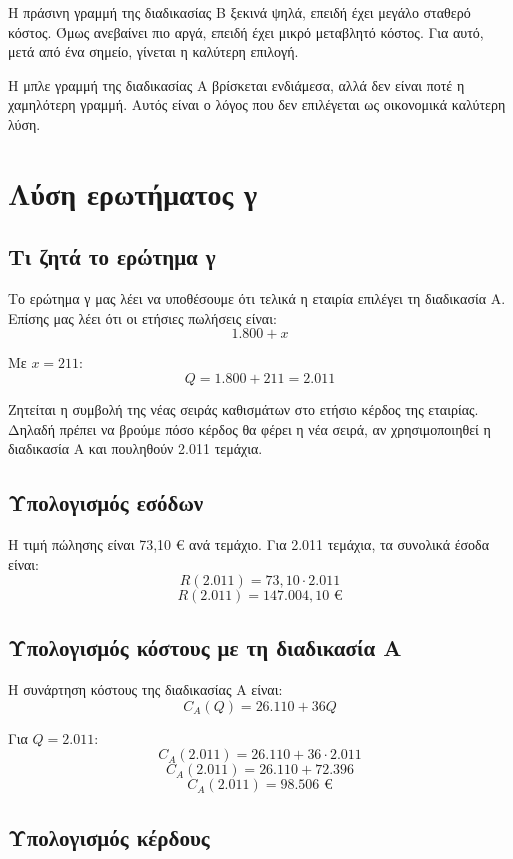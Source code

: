 \documentclass[12pt,a4paper]{article}
\begin{document}
Η πράσινη γραμμή της διαδικασίας Β ξεκινά ψηλά, επειδή έχει μεγάλο σταθερό κόστος. Όμως ανεβαίνει πιο αργά, επειδή έχει μικρό μεταβλητό κόστος. Για αυτό, μετά από ένα σημείο, γίνεται η καλύτερη επιλογή.

Η μπλε γραμμή της διαδικασίας Α βρίσκεται ενδιάμεσα, αλλά δεν είναι ποτέ η χαμηλότερη γραμμή. Αυτός είναι ο λόγος που δεν επιλέγεται ως οικονομικά καλύτερη λύση.

\section{Λύση ερωτήματος γ}

\subsection{Τι ζητά το ερώτημα γ}

Το ερώτημα γ μας λέει να υποθέσουμε ότι τελικά η εταιρία επιλέγει τη διαδικασία Α. Επίσης μας λέει ότι οι ετήσιες πωλήσεις είναι:
\[
1.800+x
\]

Με \(x=211\):
\[
Q=1.800+211=2.011
\]

Ζητείται η συμβολή της νέας σειράς καθισμάτων στο ετήσιο κέρδος της εταιρίας. Δηλαδή πρέπει να βρούμε πόσο κέρδος θα φέρει η νέα σειρά, αν χρησιμοποιηθεί η διαδικασία Α και πουληθούν 2.011 τεμάχια.

\subsection{Υπολογισμός εσόδων}

Η τιμή πώλησης είναι 73,10 € ανά τεμάχιο. Για 2.011 τεμάχια, τα συνολικά έσοδα είναι:
\[
R(2.011)=73{,}10\cdot2.011
\]
\[
R(2.011)=147.004{,}10 \text{ €}
\]

\subsection{Υπολογισμός κόστους με τη διαδικασία Α}

Η συνάρτηση κόστους της διαδικασίας Α είναι:
\[
C_A(Q)=26.110+36Q
\]

Για \(Q=2.011\):
\[
C_A(2.011)=26.110+36\cdot2.011
\]
\[
C_A(2.011)=26.110+72.396
\]
\[
C_A(2.011)=98.506 \text{ €}
\]

\subsection{Υπολογισμός κέρδους}
\end{document}

